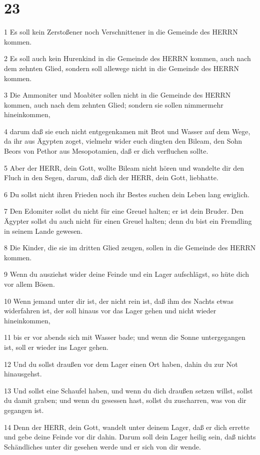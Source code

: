 \chapter{23}

\par 1 Es soll kein Zerstoßener noch Verschnittener in die Gemeinde des HERRN kommen.
\par 2 Es soll auch kein Hurenkind in die Gemeinde des HERRN kommen, auch nach dem zehnten Glied, sondern soll allewege nicht in die Gemeinde des HERRN kommen.
\par 3 Die Ammoniter und Moabiter sollen nicht in die Gemeinde des HERRN kommen, auch nach dem zehnten Glied; sondern sie sollen nimmermehr hineinkommen,
\par 4 darum daß sie euch nicht entgegenkamen mit Brot und Wasser auf dem Wege, da ihr aus Ägypten zoget, vielmehr wider euch dingten den Bileam, den Sohn Beors von Pethor aus Mesopotamien, daß er dich verfluchen sollte.
\par 5 Aber der HERR, dein Gott, wollte Bileam nicht hören und wandelte dir den Fluch in den Segen, darum, daß dich der HERR, dein Gott, liebhatte.
\par 6 Du sollst nicht ihren Frieden noch ihr Bestes suchen dein Leben lang ewiglich.
\par 7 Den Edomiter sollst du nicht für eine Greuel halten; er ist dein Bruder. Den Ägypter sollst du auch nicht für einen Greuel halten; denn du bist ein Fremdling in seinem Lande gewesen.
\par 8 Die Kinder, die sie im dritten Glied zeugen, sollen in die Gemeinde des HERRN kommen.
\par 9 Wenn du ausziehst wider deine Feinde und ein Lager aufschlägst, so hüte dich vor allem Bösen.
\par 10 Wenn jemand unter dir ist, der nicht rein ist, daß ihm des Nachts etwas widerfahren ist, der soll hinaus vor das Lager gehen und nicht wieder hineinkommen,
\par 11 bis er vor abends sich mit Wasser bade; und wenn die Sonne untergegangen ist, soll er wieder ins Lager gehen.
\par 12 Und du sollst draußen vor dem Lager einen Ort haben, dahin du zur Not hinausgehst.
\par 13 Und sollst eine Schaufel haben, und wenn du dich draußen setzen willst, sollst du damit graben; und wenn du gesessen hast, sollst du zuscharren, was von dir gegangen ist.
\par 14 Denn der HERR, dein Gott, wandelt unter deinem Lager, daß er dich errette und gebe deine Feinde vor dir dahin. Darum soll dein Lager heilig sein, daß nichts Schändliches unter dir gesehen werde und er sich von dir wende.
